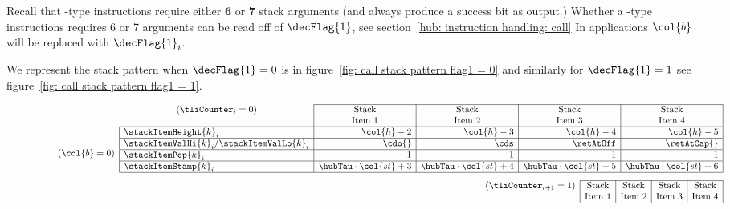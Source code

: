 Recall that -type instructions require either $\bm{6}$ or $\bm{7}$ stack arguments (and always produce a success bit as output.)
Whether a -type instructions requires 6 or 7 arguments can be read off of $\decFlag{1}$, see section~\ref{hub: instruction handling: call}
In applications $\col{b}$ will be replaced with $\decFlag{1}_{i}$.




We represent the stack pattern when $\decFlag{1}=0$ is in figure~\ref{fig: call stack pattern flag1 = 0} and similarly for $\decFlag{1}=1$ see figure~\ref{fig: call stack pattern flag1 = 1}.
\begin{figure}[h!]
\[
	\tag{$\col{b} = 0$}
	\begin{array}{r}
		\begin{array}{|l|r|r|r|r|}
		\cline{2-5}
		\multicolumn{1}{c|}{(\tliCounter_{i} = 0)} &
		\multicolumn{1}{c|}{\text{Stack}} &
		\multicolumn{1}{c|}{\text{Stack}} &
		\multicolumn{1}{c|}{\text{Stack}} &
		\multicolumn{1}{c|}{\text{Stack}} \\
		\multicolumn{1}{c|}{} &
		\multicolumn{1}{c|}{\text{Item 1}} &
		\multicolumn{1}{c|}{\text{Item 2}} &
		\multicolumn{1}{c|}{\text{Item 3}} &
		\multicolumn{1}{c|}{\text{Item 4}} \\
		\hline
		\stackItemHeight{k}_{i} &
		\col{h} - 2 & \col{h} - 3 & \col{h} - 4 & \col{h} - 5 \\
		\hline
		\stackItemValHi{k}_{i}/\stackItemValLo{k}_{i} & \cdo{} & \cds & \retAtOff & \retAtCap{} \\
		\hline
		\stackItemPop{k}_{i} & 1 & 1 & 1 & 1 \\
		\hline
		\stackItemStamp{k}_{i} & \hubTau \cdot \col{st} + 3 & \hubTau \cdot \col{st} + 4 & \hubTau \cdot \col{st} + 5 & \hubTau \cdot \col{st} + 6 \\
		\hline
		\end{array} \vspace{3mm} \\
		\begin{array}{|l|r|r|c|r|}
		\cline{2-5}
		\multicolumn{1}{c|}{(\tliCounter_{i + 1} = 1)} &
		\multicolumn{1}{c|}{\text{Stack}} &
		\multicolumn{1}{c|}{\text{Stack}} &
		\multicolumn{1}{c|}{\text{Stack}} &
		\multicolumn{1}{c|}{\text{Stack}} \\
		\multicolumn{1}{c|}{} &
		\multicolumn{1}{c|}{\text{Item 1}} &
		\multicolumn{1}{c|}{\text{Item 2}} &
		\multicolumn{1}{c|}{\text{Item 3}} &
		\multicolumn{1}{c|}{\text{Item 4}} \\

\end{array}
\end{array}\]
\end{figure}
